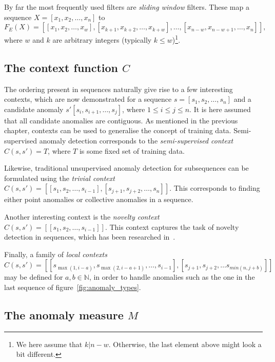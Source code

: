 By far the most frequently used filters are \emph{sliding window} filters. These map a sequence $X = [x_1, x_2, \dots, x_n]$ to
\[
    F_E(X) = [[x_1, x_2, \dots, x_w], [x_{k + 1}, x_{k + 2}, \dots, x_{k + w}], \dots, [x_{n - w}, x_{n - w + 1}, \dots, x_n]],
\]
where $w$ and $k$ are arbitrary integers (typically $k \leq w$)\footnote{We here assume that $k | n - w$. Otherwise, the last element above might look a bit different.}.

\subsection{The context function $C$}

The ordering present in sequences naturally give rise to a few interesting contexts, which are now demonstrated for a sequence $s = [s_1, s_2, \dots, s_n]$ and a candidate anomaly $s' [s_i, s_{i + 1}, \dots, s_j]$, where $1 \leq i \leq j \leq n$. It is here assumed that all candidate anomalies are contiguous. As mentioned in the previous chapter, contexts can be used to generalise the concept of training data. Semi-supervised anomaly detection corresponds to the \emph{semi-supervised context} $C(s, s') = T$, where $T$ is some fixed set of training data.

Likewise, traditional unsupervised anomaly detection for subsequences can be formulated using the \emph{trivial context} $C(s, s') = [[s_1, s_2, \dots, s_{i - 1}], [s_{j + 1}, s_{j + 2}, \dots, s_n]]$. This corresponds to finding either point anomalies or collective anomalies in a sequence.

Another interesting context is the \emph{novelty context} $C(s, s') = [[s_1, s_2, \dots, s_{i - 1}]]$. This context captures the task of novelty detection in sequences, which has been researched in~\cite{TODO}.

Finally, a family of \emph{local contexts}
\[
    C(s, s') = [[s_{\max(1, i - a)}, s_{\max(2, i - a + 1)}, \dots, s_{i-1}], [s_{j+1}, s_{j+2}, \ldots s_{min(n, j+b)}]]
\]
may be defined for $a, b \in \mathbb{N}$, in order to handle anomalies such as the one in the last sequence of figure~\ref{fig:anomaly_types}.

\subsection{The anomaly measure $M$}

